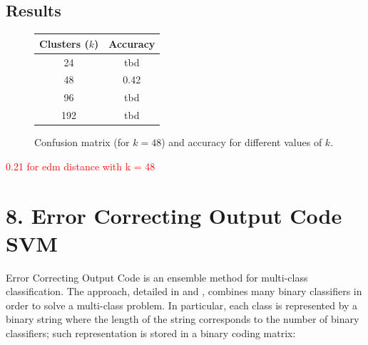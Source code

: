 \documentclass[12pt]{article}
\begin{document}
  \subsection*{Results}

  \begin{figure}[H]
    \centering
    \caption*{Confusion matrix (for \( k = 48 \)) and accuracy for different values of \( k \).}
    \quad\quad\quad
    \begin{tabular}[b]{cc}
			\toprule
      Clusters (\( k \)) & Accuracy \\
      \midrule
      24  & tbd \\
      48  & 0.42 \\
      96  & tbd \\
      192 & tbd \\
      \bottomrule
    \end{tabular}
  \end{figure}

  \textcolor{red}{0.21 for edm distance with k = 48}


  
  \section*{8. Error Correcting Output Code SVM}

  Error Correcting Output Code is an ensemble method for multi-class classification. The approach, detailed in \cite{dietterich1994solving} and \cite{james1998error}, combines many binary classifiers in order to solve a multi-class problem. In particular, each class is represented by a binary string where the length of the string corresponds to the number of binary classifiers; such representation is stored in a binary coding matrix:
\end{document}
